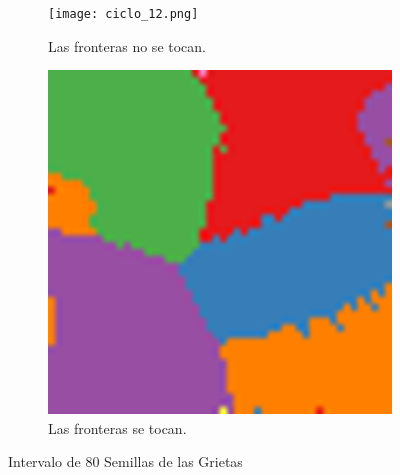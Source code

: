 \documentclass{article}
\begin{document}
\begin{figure}
     \centering
     \begin{subfigure}[b]{0.40\textwidth}
         \centering
         \texttt{[image: ciclo\_12.png]}
         \caption{Las fronteras no se tocan.}
         \label{fig:notocan}
     \end{subfigure}
     \begin{subfigure}[b]{0.40\textwidth}
         \centering
         \includegraphics[width=\textwidth]{ciclo_36.png}
         \caption{Las fronteras se tocan.}
         \label{fig:tocan}
     \end{subfigure}
     \caption{Intervalo de 80 Semillas de las Grietas}
      \label{semilla}
\end{figure}
\end{document}
